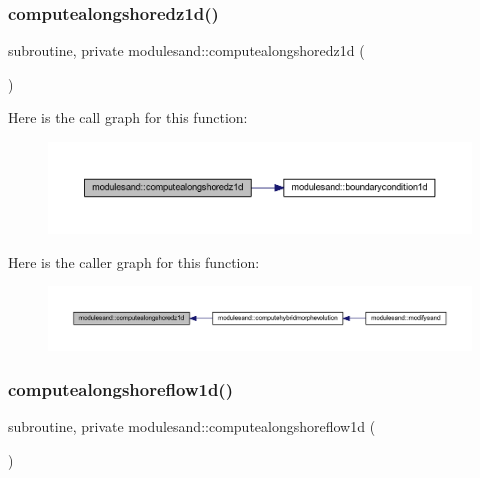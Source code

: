 \subsubsection{\texorpdfstring{computealongshoredz1d()}{computealongshoredz1d()}}
{\footnotesize\ttfamily subroutine, private modulesand\+::computealongshoredz1d (\begin{DoxyParamCaption}{ }\end{DoxyParamCaption})\hspace{0.3cm}{\ttfamily [private]}}

Here is the call graph for this function\+:\nopagebreak
\begin{figure}[H]
\begin{center}
\leavevmode
\includegraphics[width=350pt]{namespacemodulesand_a608f78fe34da2344f75a4b2f32487eae_cgraph}
\end{center}
\end{figure}
Here is the caller graph for this function\+:\nopagebreak
\begin{figure}[H]
\begin{center}
\leavevmode
\includegraphics[width=350pt]{namespacemodulesand_a608f78fe34da2344f75a4b2f32487eae_icgraph}
\end{center}
\end{figure}
\mbox{\label{namespacemodulesand_a88ad4d02a6e8f1f1c1585f441fd8a910}} 
\subsubsection{\texorpdfstring{computealongshoreflow1d()}{computealongshoreflow1d()}}
{\footnotesize\ttfamily subroutine, private modulesand\+::computealongshoreflow1d (\begin{DoxyParamCaption}{ }\end{DoxyParamCaption})\hspace{0.3cm}{\ttfamily [private]}}

